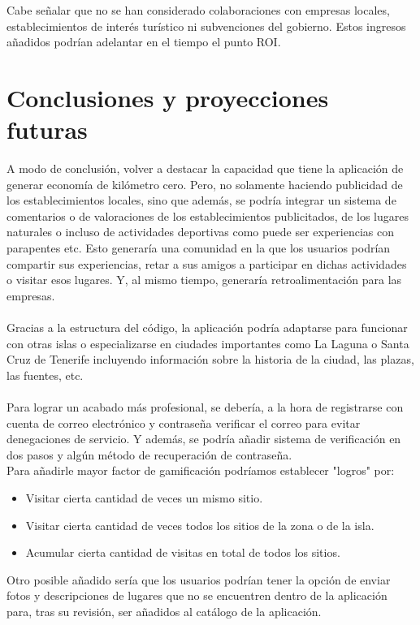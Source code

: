 \documentclass{report}
\begin{document}
Cabe señalar que no se han considerado colaboraciones con empresas locales, establecimientos de interés turístico ni subvenciones del gobierno. Estos ingresos añadidos podrían adelantar en el tiempo el punto ROI.

\chapter{Conclusiones y proyecciones futuras}
A modo de conclusión, volver a destacar la capacidad que tiene la aplicación de generar economía de kilómetro cero. Pero, no solamente haciendo publicidad de los establecimientos locales, sino que además, se podría integrar un sistema de comentarios o de valoraciones de los establecimientos publicitados, de los lugares naturales o incluso de actividades deportivas como puede ser experiencias con parapentes etc. Esto generaría una comunidad en la que los usuarios podrían compartir sus experiencias, retar a sus amigos a participar en dichas actividades o visitar esos lugares. Y, al mismo tiempo, generaría retroalimentación para las empresas.\\
\\
Gracias a la estructura del código, la aplicación podría adaptarse para funcionar con otras islas o especializarse en ciudades importantes como La Laguna o Santa Cruz de Tenerife incluyendo información sobre la historia de la ciudad, las plazas, las fuentes, etc.\\
\\
Para lograr un acabado más profesional, se debería, a la hora de registrarse con cuenta de correo electrónico y contraseña verificar el correo para evitar denegaciones de servicio. Y además, se podría añadir sistema de verificación en dos pasos y algún método de recuperación de contraseña.\\

Para añadirle mayor factor de gamificación podríamos establecer "logros" por:\\
\begin{itemize}
\item Visitar cierta cantidad de veces un mismo sitio.
\item Visitar cierta cantidad de veces todos los sitios de la zona o de la isla.
\item Acumular cierta cantidad de visitas en total de todos los sitios.
\end{itemize}

Otro posible añadido sería que los usuarios podrían tener la opción de enviar fotos y descripciones de lugares que no se encuentren dentro de la aplicación para, tras su revisión, ser añadidos al catálogo de la aplicación.\\
\end{document}
